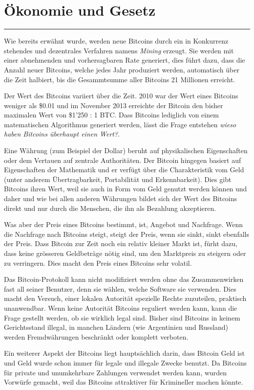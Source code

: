 \section*{Ökonomie und Gesetz}
\vspace{-10mm}
\noindent\rule{0.8\textwidth}{0.4pt}

\vspace{5mm}

\noindent
Wie bereits erwähnt wurde, werden neue Bitcoins durch ein in Konkurrenz stehendes und
dezentrales Verfahren namens \emph{Mining} erzeugt. Sie werden mit einer abnehmenden
und vorhersagbaren Rate generiert, dies führt dazu, dass die Anzahl neuer Bitcoins,
welche jedes Jahr produziert werden, automatisch über die Zeit halbiert, bis die Gesammtsumme
aller Bitcoins 21 Millionen erreicht.

\noindent
Der Wert des Bitcoins variiert über die Zeit. 2010 war der Wert eines Bitcoins weniger
als \$0.01 und im November 2013 erreichte der Bitcoin den bisher maximalen Wert
von \$1'250 : 1 BTC. Dass Bitcoins lediglich von einem matematischen Algorithmus
generiert werden, lässt die Frage entstehen \emph{\dq wieso haben Bitcoins
überhaupt einen Wert?\dq}.

\noindent
Eine Währung (zum Beispiel der Dollar) beruht auf physikalischen Eigenschaften oder dem Vertauen
auf zentrale Authoritäten. Der Bitcoin hingegen basiert auf Eigenschaften der Mathematik und
er verfügt über die Charakteristik vom Geld (unter anderem Übertragbarkeit, Portabilität und
Erkennbarkeit). Dies gibt Bitcoins ihren Wert, weil sie auch in Form vom Geld genutzt werden
können und daher und wie bei allen anderen Währungen bildet sich der Wert des Bitcoins direkt und
nur durch die Menschen, die ihn als Bezahlung akzeptieren.

\noindent
Was aber der Preis eines Bitcoins bestimmt, ist, Angebot und Nachfrage. Wenn die Nachfrage nach
Bitcoins steigt, steigt der Preis, wenn sie sinkt, sinkt ebenfalls der Preis. Dass Bitcoin zur Zeit
noch ein relativ kleiner Markt ist, fürht dazu, dass keine grösseren Geldbeträge nötig sind, um den
Marktpreis zu steigern oder zu verringern. Dies macht den Preis eines Bitcoins sehr volatil.

\noindent
Das Bitcoin-Protokoll kann nicht modifiziert werden ohne das Zusammenwirken fast all seiner Benutzer,
denn sie wählen, welche Software sie verwenden. Dies macht den Versuch, einer lokalen Autorität
spezielle Rechte zuzuteilen, praktisch unanwendbar. Wenn keine Autorität Bitcoins reguliert werden kann,
kann die Frage gestellt werden, ob sie wirklich legal sind. Bisher sind Bitcoins in keinem Gerichtsstand
illegal, in manchen Ländern (wie Argentinien und Russland) werden Fremdwährungen beschränkt oder
komplett verboten.

\noindent
Ein weiterer Aspekt der Bitcoins liegt hauptsächlich darin, dass Bitcoin Geld ist und Geld wurde
schon immer für legale und illegale Zwecke benutzt. Da Bitcoins für private und unumkehrbare Zahlungen
verwendet werden kann, wurden Vorwürfe gemacht, weil das Bitcoins attraktiver für Krimineller machen
könnte.

\newpage
